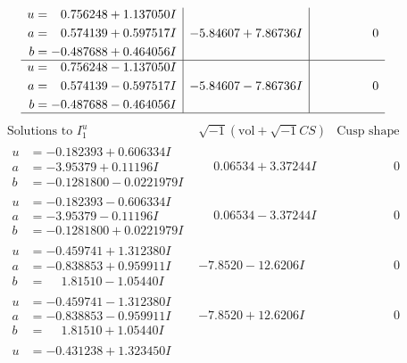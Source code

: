 \documentclass[1p]{elsarticle_modified}
\theoremstyle{definition}
\newcommand{\I}{\sqrt{-1}}
\begin{document}
$$\begin{array}{c|c|c}
\begin{aligned}
u &= \phantom{-}0.756248 + 1.137050 I \\
a &= \phantom{-}0.574139 + 0.597517 I \\
b &= -0.487688 + 0.464056 I\end{aligned}
 & -5.84607 + 7.86736 I & \phantom{-0.000000 } 0 \\ \hline\begin{aligned}
u &= \phantom{-}0.756248 - 1.137050 I \\
a &= \phantom{-}0.574139 - 0.597517 I \\
b &= -0.487688 - 0.464056 I\end{aligned}
 & -5.84607 - 7.86736 I & \phantom{-0.000000 } 0\\
 \hline 
 \end{array}$$\newpage$$\begin{array}{c|c|c}  
\text{Solutions to }I^u_{1}& \I (\text{vol} + \sqrt{-1}CS) & \text{Cusp shape}\\
 \hline 
\begin{aligned}
u &= -0.182393 + 0.606334 I \\
a &= -3.95379 + 0.11196 I \\
b &= -0.1281800 - 0.0221979 I\end{aligned}
 & \phantom{-}0.06534 + 3.37244 I & \phantom{-0.000000 } 0 \\ \hline\begin{aligned}
u &= -0.182393 - 0.606334 I \\
a &= -3.95379 - 0.11196 I \\
b &= -0.1281800 + 0.0221979 I\end{aligned}
 & \phantom{-}0.06534 - 3.37244 I & \phantom{-0.000000 } 0 \\ \hline\begin{aligned}
u &= -0.459741 + 1.312380 I \\
a &= -0.838853 + 0.959911 I \\
b &= \phantom{-}1.81510 - 1.05440 I\end{aligned}
 & -7.8520 - 12.6206 I & \phantom{-0.000000 } 0 \\ \hline\begin{aligned}
u &= -0.459741 - 1.312380 I \\
a &= -0.838853 - 0.959911 I \\
b &= \phantom{-}1.81510 + 1.05440 I\end{aligned}
 & -7.8520 + 12.6206 I & \phantom{-0.000000 } 0 \\ \hline\begin{aligned}
u &= -0.431238 + 1.323450 I \\

\end{aligned}
\end{array}$$
\end{document}
